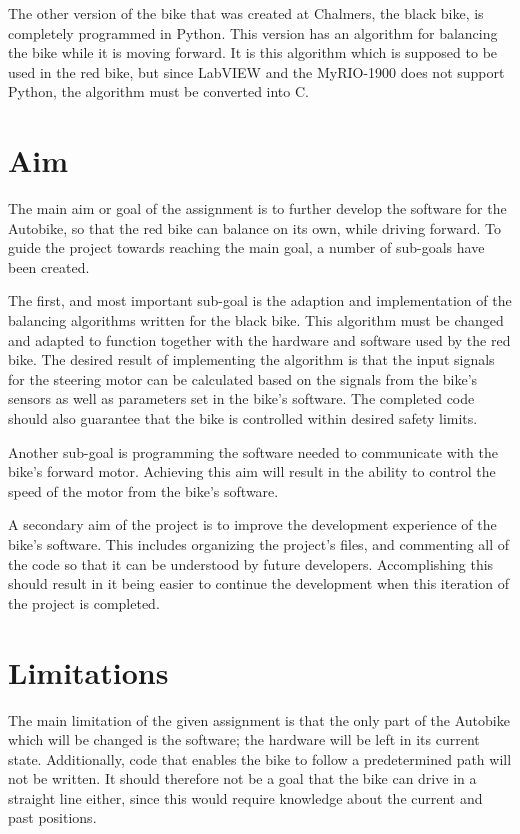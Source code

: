 The other version of the bike that was created at Chalmers, the black bike, is completely programmed in Python. This version has an algorithm for balancing the bike while it is moving forward. It is this algorithm which is supposed to be used in the red bike, but since LabVIEW and the MyRIO-1900 does not support Python, the algorithm must be converted into C.

\section{Aim} \label{intro:aim}

The main aim or goal of the assignment is to further develop the software for the Autobike, so that the red bike can balance on its own, while driving forward. To guide the project towards reaching the main goal, a number of sub-goals have been created.

The first, and most important sub-goal is the adaption and implementation of the balancing algorithms written for the black bike. This algorithm must be changed and adapted to function together with the hardware and software used by the red bike. The desired result of implementing the algorithm is that the input signals for the steering motor can be calculated based on the signals from the bike's sensors as well as parameters set in the bike's software. The completed code should also guarantee that the bike is controlled within desired safety limits.

Another sub-goal is programming the software needed to communicate with the bike's forward motor. Achieving this aim will result in the ability to control the speed of the motor from the bike's software.

A secondary aim of the project is to improve the development experience of the bike's software. This includes organizing the project's files, and commenting all of the code so that it can be understood by future developers. Accomplishing this should result in it being easier to continue the development when this iteration of the project is completed.

\section{Limitations}

The main limitation of the given assignment is that the only part of the Autobike which will be changed is the software; the hardware will be left in its current state. Additionally, code that enables the bike to follow a predetermined path will not be written. It should therefore not be a goal that the bike can drive in a straight line either, since this would require knowledge about the current and past positions. 
